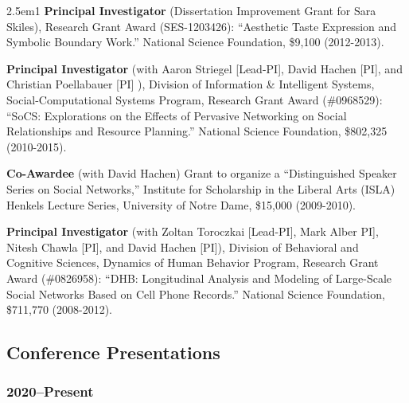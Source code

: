 \documentclass[
]{article}
\newenvironment{cventry}{\begin{hangparas}{2.5em}{1}}{\end{hangparas}}
\begin{document}
\begin{cventry}
\textbf{Principal Investigator} (Dissertation Improvement Grant for Sara
Skiles), Research Grant Award (SES-1203426): ``Aesthetic Taste
Expression and Symbolic Boundary Work.'' National Science Foundation,
\$9,100 (2012-2013).

\textbf{Principal Investigator} (with Aaron Striegel {[}Lead-PI{]},
David Hachen {[}PI{]}, and Christian Poellabauer {[}PI{]} ), Division of
Information \& Intelligent Systems, Social-Computational Systems
Program, Research Grant Award (\#0968529): ``SoCS: Explorations on the
Effects of Pervasive Networking on Social Relationships and Resource
Planning.'' National Science Foundation, \$802,325 (2010-2015).

\textbf{Co-Awardee} (with David Hachen) Grant to organize a
``Distinguished Speaker Series on Social Networks,'' Institute for
Scholarship in the Liberal Arts (ISLA) Henkels Lecture Series,
University of Notre Dame, \$15,000 (2009-2010).

\textbf{Principal Investigator} (with Zoltan Toroczkai {[}Lead-PI{]},
Mark Alber PI{]}, Nitesh Chawla {[}PI{]}, and David Hachen {[}PI{]}),
Division of Behavioral and Cognitive Sciences, Dynamics of Human
Behavior Program, Research Grant Award (\#0826958): ``DHB: Longitudinal
Analysis and Modeling of Large-Scale Social Networks Based on Cell Phone
Records.'' National Science Foundation, \$711,770 (2008-2012).

\end{cventry}

\subsection{Conference Presentations}\label{conference-presentations}

\subsubsection{2020--Present}\label{present-3}
\end{document}
